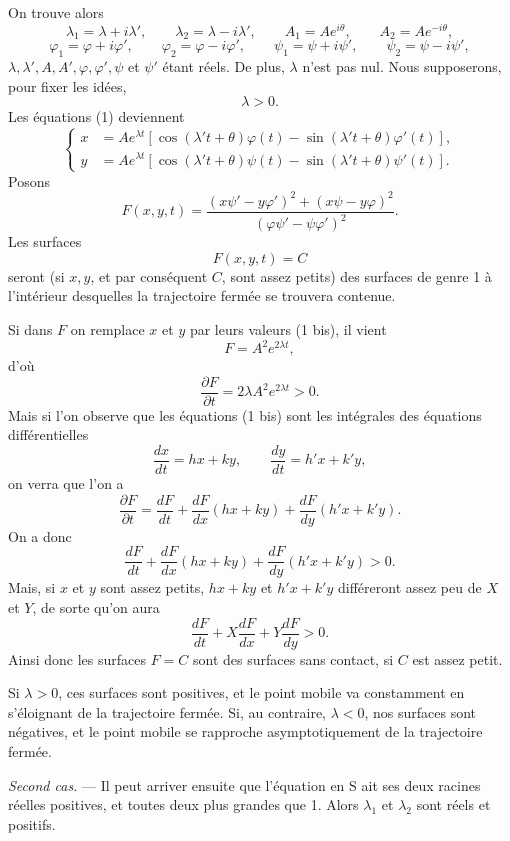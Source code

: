 \documentclass[11pt]{article}
\begin{document}
On trouve alors
\[
\lambda_1=\lambda+i\lambda',
\qquad
\lambda_2=\lambda-i\lambda',
\qquad
A_1=Ae^{i\theta},
\qquad
A_2=Ae^{-i\theta},
\]
\[
\varphi_1=\varphi+i\varphi',
\qquad
\varphi_2=\varphi-i\varphi',
\qquad
\psi_1=\psi+i\psi',
\qquad
\psi_2=\psi-i\psi',
\]
$\lambda,\lambda',A,A',\varphi,\varphi',\psi$ et $\psi'$ étant réels. De plus, $\lambda$ n’est pas nul. Nous supposerons, pour fixer les idées,
\[
\lambda>0.
\]
Les équations (1) deviennent
\begin{equation}
\left\{
\begin{aligned}
x&=Ae^{\lambda t}\left[\cos(\lambda't+\theta)\varphi(t)-\sin(\lambda't+\theta)\varphi'(t)\right],\\
y&=Ae^{\lambda t}\left[\cos(\lambda't+\theta)\psi(t)-\sin(\lambda't+\theta)\psi'(t)\right].
\end{aligned}
\right.
\tag{1 bis}
\end{equation}
Posons
\[
F(x,y,t)=\frac{(x\psi'-y\varphi')^2+(x\psi-y\varphi)^2}{(\varphi\psi'-\psi\varphi')^2}.
\]
Les surfaces
\[
F(x,y,t)=C
\]
seront (si $x,y$, et par conséquent $C$, sont assez petits) des surfaces de genre 1 à l’intérieur desquelles la trajectoire fermée se trouvera contenue.

Si dans $F$ on remplace $x$ et $y$ par leurs valeurs (1 bis), il vient
\[
F=A^2e^{2\lambda t},
\]
d’où
\[
\frac{\partial F}{\partial t}=2\lambda A^2e^{2\lambda t}>0.
\]
Mais si l’on observe que les équations (1 bis) sont les intégrales des équations différentielles
\[
\frac{dx}{dt}=hx+ky,
\qquad
\frac{dy}{dt}=h'x+k'y,
\]
on verra que l’on a
\[
\frac{\partial F}{\partial t}=\frac{dF}{dt}+\frac{dF}{dx}(hx+ky)+\frac{dF}{dy}(h'x+k'y).
\]
On a donc
\[
\frac{dF}{dt}+\frac{dF}{dx}(hx+ky)+\frac{dF}{dy}(h'x+k'y)>0.
\]
Mais, si $x$ et $y$ sont assez petits, $hx+ky$ et $h'x+k'y$ différeront assez peu de $X$ et $Y$, de sorte qu’on aura
\[
\frac{dF}{dt}+X\frac{dF}{dx}+Y\frac{dF}{dy}>0.
\]
Ainsi donc les surfaces $F=C$ sont des surfaces sans contact, si $C$ est assez petit.

Si $\lambda>0$, ces surfaces sont positives, et le point mobile va constamment en s’éloignant de la trajectoire fermée. Si, au contraire, $\lambda<0$, nos surfaces sont négatives, et le point mobile se rapproche asymptotiquement de la trajectoire fermée.

\emph{Second cas.} — Il peut arriver ensuite que l’équation en $\mathrm{S}$ ait ses deux racines réelles positives, et toutes deux plus grandes que 1. Alors $\lambda_1$ et $\lambda_2$ sont réels et positifs.
\end{document}
